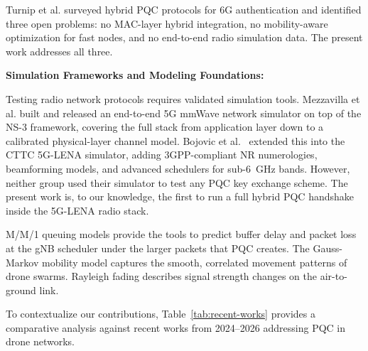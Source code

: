 \documentclass{ieeeaccess}
\begin{document}
Turnip et al. \cite{ref5} surveyed hybrid PQC protocols for 6G authentication and identified three open problems: no MAC-layer hybrid integration, no mobility-aware optimization for fast nodes, and no end-to-end radio simulation data. The present work addresses all three.

\vspace{2mm}\noindent\textbf{Simulation Frameworks and Modeling Foundations:}

Testing radio network protocols requires validated simulation tools. Mezzavilla et al. \cite{ref11} built and released an end-to-end 5G mmWave network simulator on top of the NS-3 framework, covering the full stack from application layer down to a calibrated physical-layer channel model. Bojovic et al.~\cite{ref12} extended this into the CTTC 5G-LENA simulator, adding 3GPP-compliant NR numerologies, beamforming models, and advanced schedulers for sub-6~GHz bands. However, neither group used their simulator to test any PQC key exchange scheme. The present work is, to our knowledge, the first to run a full hybrid PQC handshake inside the 5G-LENA radio stack.

M/M/1 queuing models provide the tools to predict buffer delay and packet loss at the gNB scheduler under the larger packets that PQC creates. The Gauss-Markov mobility model captures the smooth, correlated movement patterns of drone swarms. Rayleigh fading describes signal strength changes on the air-to-ground link.

To contextualize our contributions, Table~\ref{tab:recent-works} provides a comparative analysis against recent works from 2024--2026 addressing PQC in drone networks.

\begin{table}[ht]
\centering
\caption{Comparison with Recent PQC-Drone Literature (2024--2026)}
\label{tab:recent-works}
\end{table}
\end{document}
